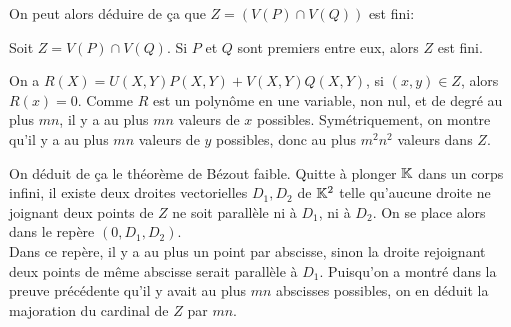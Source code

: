 \documentclass{article}
\begin{document}
On peut alors déduire de ça que $Z = (V(P) \cap V(Q))$ est fini:
\begin{proposition}
    Soit $Z = V(P) \cap V(Q)$. Si $P$ et $Q$ sont premiers entre eux, alors $Z$ est fini.
\end{proposition}
\begin{preuve}
    On a $R(X) = U(X, Y)P(X, Y) + V(X, Y)Q(X, Y)$, si $(x, y) \in Z$, alors $R(x) = 0$. Comme $R$ est un polynôme en une variable, non nul, et de degré au plus $mn$, il y a au plus $mn$ valeurs de $x$ possibles. Symétriquement, on montre qu'il y a au plus $mn$ valeurs de $y$ possibles, donc au plus $m^2n^2$ valeurs dans $Z$.\\
\end{preuve}

On déduit de ça le théorème de Bézout faible. Quitte à plonger $\mathbb{K}$ dans un corps infini, il existe deux droites vectorielles $D_1, D_2$ de $\mathbb{K}^2$ telle qu'aucune droite ne joignant deux points de $Z$ ne soit parallèle ni à $D_1$, ni à $D_2$. On se place alors dans le repère $(0, D_1, D_2)$.\\
Dans ce repère, il y a au plus un point par abscisse, sinon la droite rejoignant deux points de même abscisse serait parallèle à $D_1$. Puisqu'on a montré dans la preuve précédente qu'il y avait au plus $mn$ abscisses possibles, on en déduit la majoration du cardinal de $Z$ par $mn$.
\end{document}
